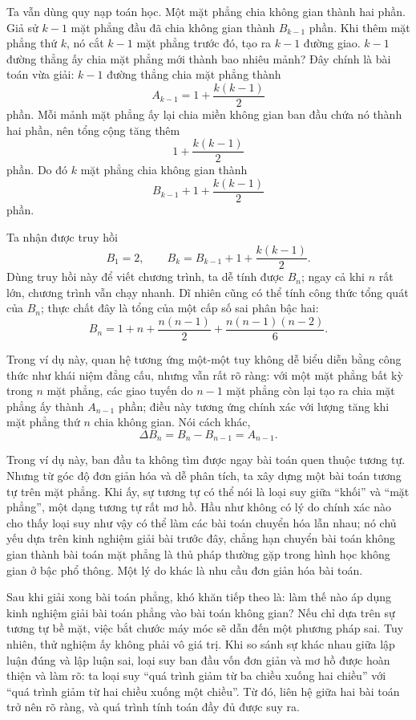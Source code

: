 \documentclass[11pt]{article}
\begin{document}
Ta vẫn dùng quy nạp toán học. Một mặt phẳng chia không gian thành hai phần.
Giả sử \(k-1\) mặt phẳng đầu đã chia không gian thành \(B_{k-1}\) phần. Khi
thêm mặt phẳng thứ \(k\), nó cắt \(k-1\) mặt phẳng trước đó, tạo ra
\(k-1\) đường giao. \(k-1\) đường thẳng ấy chia mặt phẳng mới thành bao nhiêu
mảnh? Đây chính là bài toán vừa giải: \(k-1\) đường thẳng chia mặt phẳng thành
\[
  A_{k-1}=1+\frac{k(k-1)}{2}
\]
phần. Mỗi mảnh mặt phẳng ấy lại chia miền không gian ban đầu chứa nó thành
hai phần, nên tổng cộng tăng thêm
\[
  1+\frac{k(k-1)}{2}
\]
phần. Do đó \(k\) mặt phẳng chia không gian thành
\[
  B_{k-1}+1+\frac{k(k-1)}{2}
\]
phần.

Ta nhận được truy hồi
\[
  B_1=2,\qquad
  B_k=B_{k-1}+1+\frac{k(k-1)}{2}.
\]
Dùng truy hồi này để viết chương trình, ta dễ tính được \(B_n\); ngay cả khi
\(n\) rất lớn, chương trình vẫn chạy nhanh. Dĩ nhiên cũng có thể tính công
thức tổng quát của \(B_n\); thực chất đây là tổng của một cấp số sai phân bậc
hai:
\[
  B_n=1+n+\frac{n(n-1)}{2}+\frac{n(n-1)(n-2)}{6}.
\]

Trong ví dụ này, quan hệ tương ứng một-một tuy không dễ biểu diễn bằng công
thức như khái niệm đẳng cấu, nhưng vẫn rất rõ ràng: với một mặt phẳng bất kỳ
trong \(n\) mặt phẳng, các giao tuyến do \(n-1\) mặt phẳng còn lại tạo ra chia
mặt phẳng ấy thành \(A_{n-1}\) phần; điều này tương ứng chính xác với lượng
tăng khi mặt phẳng thứ \(n\) chia không gian. Nói cách khác,
\[
  \Delta B_n=B_n-B_{n-1}=A_{n-1}.
\]

Trong ví dụ này, ban đầu ta không tìm được ngay bài toán quen thuộc tương tự.
Nhưng từ góc độ đơn giản hóa và dễ phân tích, ta xây dựng một bài toán tương
tự trên mặt phẳng. Khi ấy, sự tương tự có thể nói là loại suy giữa ``khối'' và
``mặt phẳng'', một dạng tương tự rất mơ hồ. Hầu như không có lý do chính xác
nào cho thấy loại suy như vậy có thể làm các bài toán chuyển hóa lẫn nhau; nó
chủ yếu dựa trên kinh nghiệm giải bài trước đây, chẳng hạn chuyển bài toán
không gian thành bài toán mặt phẳng là thủ pháp thường gặp trong hình học
không gian ở bậc phổ thông. Một lý do khác là nhu cầu đơn giản hóa bài toán.

Sau khi giải xong bài toán phẳng, khó khăn tiếp theo là: làm thế nào áp dụng
kinh nghiệm giải bài toán phẳng vào bài toán không gian? Nếu chỉ dựa trên sự
tương tự bề mặt, việc bắt chước máy móc sẽ dẫn đến một phương pháp sai. Tuy
nhiên, thử nghiệm ấy không phải vô giá trị. Khi so sánh sự khác nhau giữa lập
luận đúng và lập luận sai, loại suy ban đầu vốn đơn giản và mơ hồ được hoàn
thiện và làm rõ: ta loại suy ``quá trình giảm từ ba chiều xuống hai chiều''
với ``quá trình giảm từ hai chiều xuống một chiều''. Từ đó, liên hệ giữa hai
bài toán trở nên rõ ràng, và quá trình tính toán đầy đủ được suy ra.
\end{document}
